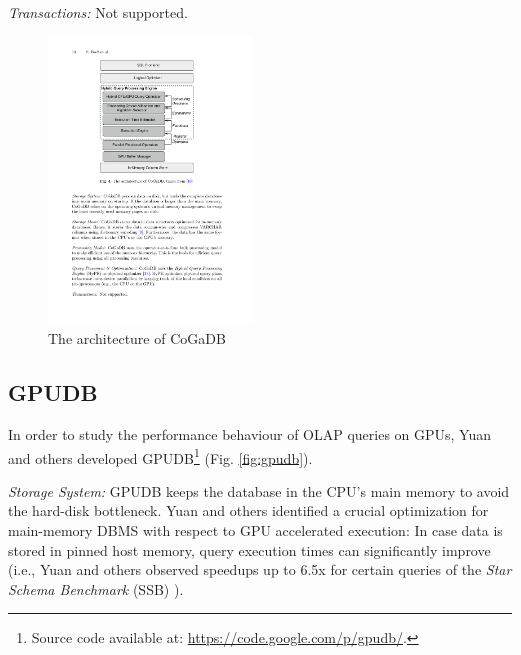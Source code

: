 \documentclass[twocolumn]{article}
\begin{document}
\noindent
\textit{Transactions:} Not supported.
\begin{figure}[htb]
        \centering
        \includegraphics[width=0.48\textwidth]{cogadb.pdf}
        \caption{The architecture of CoGaDB}
        \label{fig:cogadb}
\end{figure}

\subsection{GPUDB}
In order to study the performance behaviour of OLAP queries on GPUs, Yuan and others developed GPUDB\footnote{Source code available at: \href{https://code.google.com/p/gpudb/}{https://code.google.com/p/gpudb/}.} \cite{Yuan:2013} (Fig. \ref{fig:gpudb}).

\noindent
\textit{Storage System:} 
GPUDB keeps the database in the CPU’s main memory to avoid the hard-disk bottleneck. Yuan and others identified a crucial optimization for main-memory DBMS with respect to GPU accelerated execution: In case data is stored in pinned host memory, query execution times can significantly improve (i.e., Yuan and others observed speedups up to 6.5x for certain queries of the \textit{Star Schema Benchmark} (SSB) \cite{Rabl:2013}).
\end{document}
